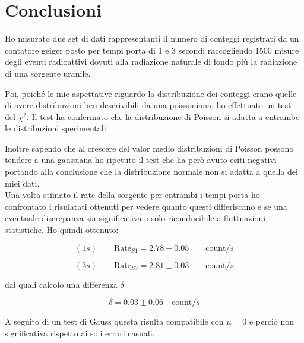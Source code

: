 \documentclass{article}
\begin{document}
\section{Conclusioni}





Ho misurato due set di dati rappresentanti il numero di conteggi registrati da un contatore geiger posto per tempi porta di 1 e 3 secondi raccogliendo 1500 misure degli eventi radioattivi dovuti alla radiazione naturale di fondo più la radiazione di una sorgente uranile.


Poi, poiché le mie aspettative riguardo la distribuzione dei conteggi erano quelle di avere distribuzioni ben descrivibili da una poissoniana, ho effettuato un test del $\chi^2$. Il test ha confermato che la distribuzione di Poisson si adatta a entrambe le distribuzioni sperimentali. 


Inoltre sapendo che al crescere del valor medio distribuzioni di Poisson possono tendere a una gaussiana ho ripetuto il test che ha però avuto esiti negativi portando alla conclusione che la distribuzione normale non si adatta a quella dei miei dati.\\


\noindent
Una volta stimato il rate della sorgente per entrambi i tempi porta ho confrontato i risulatati ottenuti per vedere quanto questi differiscano e se una eventuale discrepanza sia significativa o solo riconducibile a fluttuazioni statistiche. Ho quindi ottenuto:

\[
	(1s) \qquad \text{Rate}_{S1} = 2.78 \pm 0.05 \qquad \text{count}/s
\]

\[
	(3s) \qquad \text{Rate}_{S3} =  2.81 \pm 0.03  \qquad \text{count}/s
\]

dai quali calcolo una differenza $\delta$

\[
	\delta = 0.03 \pm 0.06 \quad \text{count}/s	
\]

A seguito di un test di Gauss questa risulta compatibile con $\mu = 0$ e perciò non significativa rispetto ai soli errori casuali.
\end{document}
